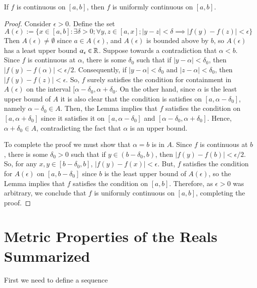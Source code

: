 \begin{thm}
    If $f$ is continuous on $[a,b]$, then $f$ is uniformly continuous on $[a,b]$.
\end{thm}
\begin{proof}
    Consider $\epsilon > 0$. Define the set $$A(\epsilon) := \{x \in [a,b]:\exists \delta > 0;\forall y,z \in [a,x];|y-z| < \delta \implies|f(y) - f(z)| < \epsilon\}$$
    Then $A(\epsilon) \neq \emptyset$ since $a \in A(\epsilon)$, and $A(\epsilon)$ is bounded above by $b$, so $A(\epsilon)$ has a least upper bound $\alpha_{\epsilon} \in \mathbb R$. Suppose towards a contradiction that $\alpha < b$. Since $f$ is continuous at $\alpha$, there is some $\delta_0$ such that if $|y-\alpha| < \delta_0$, then $|f(y) - f(\alpha)| < \epsilon/2$. Consequently, if $|y-\alpha| < \delta_0$ and $|z-\alpha| < \delta_0$, then $|f(y) - f(z)| < \epsilon$. So, $f$ surely satisfies the condition for containment in $A(\epsilon)$ on the interval $[\alpha - \delta_0, \alpha + \delta_0$. On the other hand, since $\alpha$ is the least upper bound of $A$ it is also clear that the condition is satisfies on $[a,\alpha - \delta_0]$, namely $\alpha - \delta_0 \in A$. Then, the Lemma implies that $f$ satisfies the condition on $[a,\alpha+\delta_0]$ since it satisfies it on $[a,\alpha - \delta_0]$ and $[\alpha - \delta_0, \alpha + \delta_0]$. Hence, $\alpha + \delta_0 \in A$, contradicting the fact that $\alpha$ is an upper bound.


    To complete the proof we must show that $\alpha = b$ is in $A$. Since $f$ is continuous at $b$, there is some $\delta_0 > 0$ such that if $y \in (b-\delta_0, b)$, then $|f(y) - f(b)| < \epsilon/2$. So, for any $x,y \in [b-\delta_0,b]$, $|f(y) - f(x)| < \epsilon$. But, $f$ satisfies the condition for $A(\epsilon)$ on $[a,b-\delta_0]$ since $b$ is the least upper bound of $A(\epsilon)$, so the Lemma implies that $f$ satisfies the condition on $[a,b]$. Therefore, as $\epsilon > 0$ was arbitrary, we conclude that $f$ is uniformly continuous on $[a,b]$, completing the proof.
\end{proof}




\section{Metric Properties of the Reals Summarized}

First we need to define a sequence


